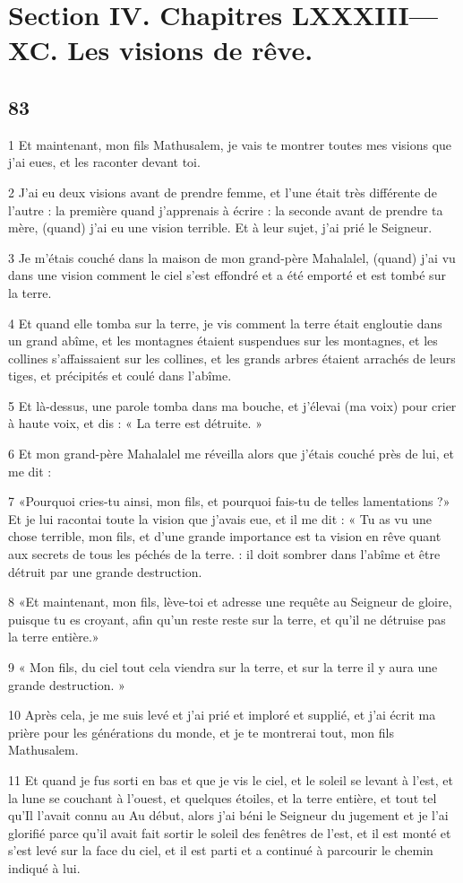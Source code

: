 \part{Section IV. Chapitres LXXXIII—XC. Les visions de rêve.}

\chapter{83}

\par 1 Et maintenant, mon fils Mathusalem, je vais te montrer toutes mes visions que j'ai eues, et les raconter devant toi.
\par 2 J'ai eu deux visions avant de prendre femme, et l'une était très différente de l'autre : la première quand j'apprenais à écrire : la seconde avant de prendre ta mère, (quand) j'ai eu une vision terrible. Et à leur sujet, j'ai prié le Seigneur.
\par 3 Je m'étais couché dans la maison de mon grand-père Mahalalel, (quand) j'ai vu dans une vision comment le ciel s'est effondré et a été emporté et est tombé sur la terre.
\par 4 Et quand elle tomba sur la terre, je vis comment la terre était engloutie dans un grand abîme, et les montagnes étaient suspendues sur les montagnes, et les collines s'affaissaient sur les collines, et les grands arbres étaient arrachés de leurs tiges, et précipités et coulé dans l'abîme.
\par 5 Et là-dessus, une parole tomba dans ma bouche, et j'élevai (ma voix) pour crier à haute voix, et dis : « La terre est détruite. »
\par 6 Et mon grand-père Mahalalel me réveilla alors que j'étais couché près de lui, et me dit :
\par 7 «Pourquoi cries-tu ainsi, mon fils, et pourquoi fais-tu de telles lamentations ?» Et je lui racontai toute la vision que j'avais eue, et il me dit : « Tu as vu une chose terrible, mon fils, et d'une grande importance est ta vision en rêve quant aux secrets de tous les péchés de la terre. : il doit sombrer dans l’abîme et être détruit par une grande destruction.
\par 8 «Et maintenant, mon fils, lève-toi et adresse une requête au Seigneur de gloire, puisque tu es croyant, afin qu'un reste reste sur la terre, et qu'il ne détruise pas la terre entière.»
\par 9 « Mon fils, du ciel tout cela viendra sur la terre, et sur la terre il y aura une grande destruction. »
\par 10 Après cela, je me suis levé et j'ai prié et imploré et supplié, et j'ai écrit ma prière pour les générations du monde, et je te montrerai tout, mon fils Mathusalem.
\par 11 Et quand je fus sorti en bas et que je vis le ciel, et le soleil se levant à l'est, et la lune se couchant à l'ouest, et quelques étoiles, et la terre entière, et tout tel qu'Il l'avait connu au Au début, alors j'ai béni le Seigneur du jugement et je l'ai glorifié parce qu'il avait fait sortir le soleil des fenêtres de l'est, et il est monté et s'est levé sur la face du ciel, et il est parti et a continué à parcourir le chemin indiqué à lui.

